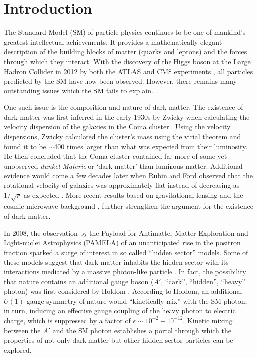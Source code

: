 
\chapter{Introduction}

The Standard Model (SM) of particle physics continues to be one of mankind's 
greatest intellectual achievements.  It provides a mathematically elegant 
description of the building blocks of matter (quarks and leptons) and the 
forces through which they interact.  With the discovery of the Higgs boson at the
Large Hadron Collider in 2012 by both the ATLAS and CMS experiments
\cite{Aad:2012tfa, Chatrchyan:2012xdj}, all particles predicted by the SM have
now been observed.  However, there remains many outstanding issues which the SM
fails to explain.  

One such issue is the composition and nature of dark matter. The 
existence of dark matter was first inferred in the early 1930s by Zwicky when
calculating the velocity dispersion of the galaxies in the Coma cluster 
\cite{Zwicky:1933gu}.  Using the velocity dispersions, Zwicky calculated the 
cluster's mass using the virial theorem and found it to be $\sim$400 times 
larger than what was expected from their luminosity.  He then concluded that 
the Coma cluster contained far more of some yet unobserved \emph{dunkel Materie}
or `dark matter' than luminous matter.  Additional evidence would come 
a few decades later when Rubin and Ford observed that the rotational velocity
of galaxies was approximately flat instead of decreasing as $1/\sqrt{r}$ as 
expected \cite{Rubin:1980zd}.  More recent results based on gravitational
lensing \cite{Clowe:2006eq} and the cosmic microwave background 
\cite{Adam:2015rua}, further strengthen the argument for the existence of dark 
matter.

In 2008, the observation by the Payload for Antimatter Matter Exploration and 
Light-nuclei Astrophysics (PAMELA) of an unanticipated rise in the positron 
fraction \cite{Adriani:2008zr} sparked a surge of interest in so called 
``hidden sector'' models.  Some of these models suggest that dark matter 
inhabits the hidden sector with its interactions mediated by a massive 
photon-like particle \cite{ArkaniHamed:2008qn, Pospelov:2008jd, Hooper:2012cw}.
In fact, the possibility that nature contains an 
additional gauge boson  ($A'$, ``dark'', ``hidden'', ``heavy'' photon) was 
first considered by Holdom \cite{Holdom:1985ag}.  According to Holdom, 
an additional $U(1)$ gauge
symmetry of nature would ``kinetically mix'' with the SM photon, in turn, 
inducing an effective gauge coupling of the heavy photon to electric charge, 
which is suppressed by a factor of $\epsilon \sim 10^{-2} - 10^{-12}$.  
Kinetic mixing between the $A'$ and the SM photon establishes a portal through which
the properties of not only dark matter but other hidden sector particles can be
explored.

